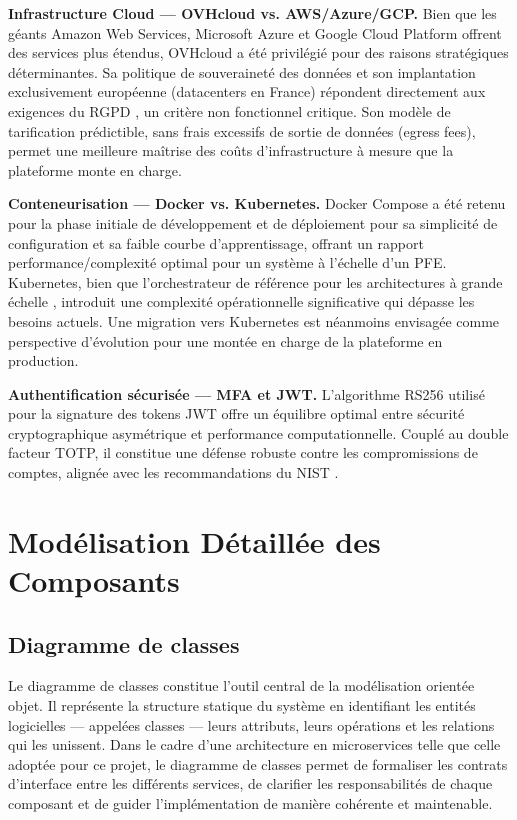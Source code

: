 \textbf{Infrastructure Cloud — OVHcloud vs. AWS/Azure/GCP.} Bien que les géants Amazon Web Services, Microsoft Azure et Google Cloud Platform offrent des services plus étendus, OVHcloud a été privilégié pour des raisons stratégiques déterminantes. Sa politique de souveraineté des données et son implantation exclusivement européenne (datacenters en France) répondent directement aux exigences du RGPD \cite{rgpd}, un critère non fonctionnel critique. Son modèle de tarification prédictible, sans frais excessifs de sortie de données (egress fees), permet une meilleure maîtrise des coûts d'infrastructure à mesure que la plateforme monte en charge.

\textbf{Conteneurisation — Docker vs. Kubernetes.} Docker Compose a été retenu pour la phase initiale de développement et de déploiement pour sa simplicité de configuration et sa faible courbe d'apprentissage, offrant un rapport performance/complexité optimal pour un système à l'échelle d'un PFE. Kubernetes, bien que l'orchestrateur de référence pour les architectures à grande échelle \cite{docker}, introduit une complexité opérationnelle significative qui dépasse les besoins actuels. Une migration vers Kubernetes est néanmoins envisagée comme perspective d'évolution pour une montée en charge de la plateforme en production.

\textbf{Authentification sécurisée — MFA et JWT.} L'algorithme RS256 utilisé pour la signature des tokens JWT offre un équilibre optimal entre sécurité cryptographique asymétrique et performance computationnelle. Couplé au double facteur TOTP, il constitue une défense robuste contre les compromissions de comptes, alignée avec les recommandations du NIST \cite{nist}.

\section{Modélisation Détaillée des Composants}

\subsection{Diagramme de classes}
Le diagramme de classes constitue l'outil central de la modélisation orientée objet. Il représente la structure statique du système en identifiant les entités logicielles — appelées classes — leurs attributs, leurs opérations et les relations qui les unissent. Dans le cadre d'une architecture en microservices telle que celle adoptée pour ce projet, le diagramme de classes permet de formaliser les contrats d'interface entre les différents services, de clarifier les responsabilités de chaque composant et de guider l'implémentation de manière cohérente et maintenable.

